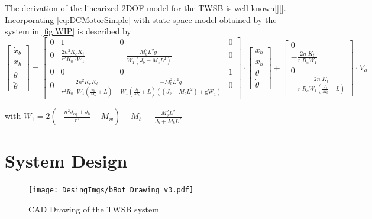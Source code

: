     The derivation of the linearized 2DOF model for the TWSB is well known[][]. Incorporating \ref{eq:DCMotorSimple}
    with state space model obtained by \cite{Velazquez2016VelocityAM} the system in \ref{fig:WIP} is described by 
    \begin{equation}
        \left\lbrack \begin{array}{c}
        {\dot{x} }_b \\
        {\ddot{x} }_b \\
        \dot{\theta} \\
        \ddot{\theta} 
        \end{array}\right\rbrack =\left\lbrack \begin{array}{cccc}
        0 & 1 & 0 & 0\\
        0 & \frac{2n^2 K_e K_t }{r^2 R_a \cdot W_1 } & -\frac{M_b^2 L^2 g\;}{W_1 \left(J_b -M_c L^2 \right)} & 0\\
        0 & 0 & 0 & 1\\
        0 & \frac{2n^2 K_e K_t }{r^2 R_a \cdot W_1 \left(\frac{J_b }{M_b }+L\right)} & \frac{{-M}_b^2 L^2 g}{W_1 \left(\frac{J_b }{M_b }+L\right)\left(\left(J_b -M_c L^2 \right)+{\mathrm{gW}}_1 \right)} & 0
        \end{array}\right\rbrack \cdot \left\lbrack \begin{array}{c}
        x_b \\
        {\dot{x} }_b \\
        \theta \\
        \dot{\theta} 
        \end{array}\right\rbrack +\left\lbrack \begin{array}{c}
        0\\
        -\frac{2{n\;K}_t }{r\;R_a W_1 }\\
        0\\
        -\frac{2n\;K_t }{r\;R_a W_1 \left(\frac{J_b }{M_b }+L\right)}
        \end{array}\right\rbrack \cdot V_a
        \label{eq:2DOF}
    \end{equation} 

    with $W_1 =2\left(-\frac{n^2 J_{\mathrm{eq}} +J_b }{r^2 }-M_w \right)-M_b +\;\frac{M_b^2 L^2 }{J_b +M_b L^2 }$ 

    \pagebreak{}

    \section{System Design}
        \begin{figure}[H]
            \texttt{[image: DesingImgs/bBot Drawing v3.pdf]}
            \caption{CAD Drawing of the TWSB system}
            \label{fig:CAD}
        \end{figure}

